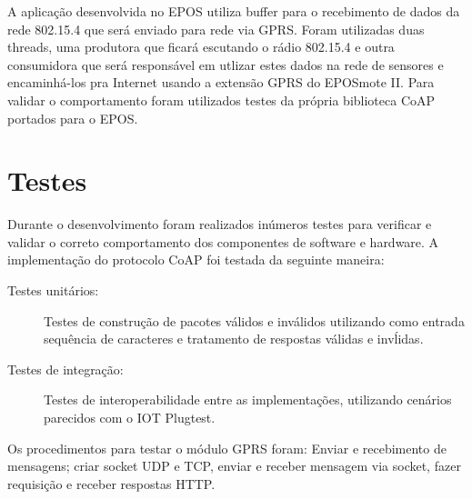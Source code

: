A aplica\c{c}\~ao desenvolvida no EPOS utiliza buffer para o recebimento de dados da rede 802.15.4 que ser\'a enviado para rede via GPRS. Foram utilizadas duas threads, uma produtora que ficar\'a escutando o r\'adio 802.15.4 e outra consumidora que ser\'a respons\'avel em utlizar estes dados na rede de sensores e encaminh\'a-los pra Internet usando a extens\~ao GPRS do EPOSmote II. Para validar o comportamento foram utilizados testes da pr\'opria biblioteca CoAP portados para o EPOS.

\section{Testes}

Durante o desenvolvimento foram realizados in\'umeros testes para verificar e validar o correto comportamento dos componentes de software e hardware.  A implementa\c{c}\~ao do protocolo CoAP foi testada da seguinte maneira:

\begin{description}
    \item[Testes unit\'arios:] Testes de constru\c{c}\~ao de pacotes v\'alidos e inv\'alidos utilizando como entrada sequ\^encia de caracteres e tratamento de respostas v\'alidas e inv\'lidas.
    \item[Testes de integra\c{c}\~ao:] Testes de interoperabilidade entre as implementa\c{c}\~oes, utilizando cen\'arios parecidos com o IOT Plugtest.
\end{description}

Os procedimentos para testar o m\'odulo GPRS foram: Enviar e recebimento de mensagens; criar socket UDP e TCP, enviar e receber mensagem via socket, fazer requisi\c{c}\~ao e receber respostas HTTP.
